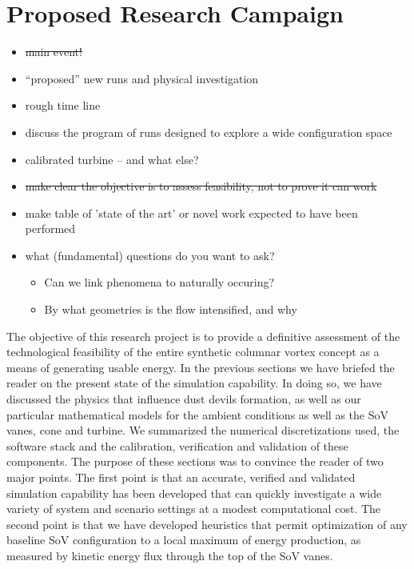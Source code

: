 \section{Proposed Research Campaign}
\label{sec:proposed_work}

\begin{itemize}
\item \st{main event!}
\item ``proposed'' new runs and physical investigation
\item rough time line
\item discuss the program of runs designed to explore a wide configuration space
\item calibrated turbine -- and what else?
\item \st{make clear the objective is to assess feasibility, not to prove it can work}
\item make table of 'state of the art' or novel work expected to have been performed
\item what (fundamental) questions do you want to ask?
      \begin{itemize}
      \item Can we link phenomena to naturally occuring?
      \item By what geometries is the flow intensified, and why
      \end{itemize}
\end{itemize}

The objective of this research project is to provide a definitive
assessment of the  
technological feasibility of the entire synthetic columnar vortex
concept as a means of generating usable energy. In the 
previous sections we have briefed the reader on the present state of the
simulation capability. In doing so, we have discussed the physics that
influence dust devils formation, as well as our particular mathematical
models for the ambient conditions as well as the SoV vanes, cone and
turbine. We summarized the numerical discretizations used, the software
stack and the calibration, verification and validation of these
components. The purpose of these sections was to convince the reader of
two major points. The first point is that an accurate, verified and
validated simulation capability has been developed that can quickly
investigate a wide variety of system and scenario settings at a modest
computational cost. The second point is that we have developed
heuristics that permit optimization of any baseline SoV configuration to
a local maximum of energy production, as measured by kinetic energy flux
through the top of the SoV vanes.  

